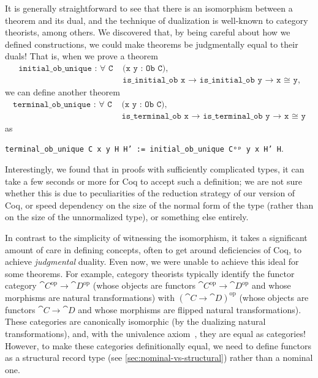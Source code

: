   It is generally straightforward to see that there is an isomorphism between a theorem and its dual, and the technique of dualization is well-known to category theorists, among others.  We discovered that, by being careful about how we defined constructions, we could make theorems be judgmentally equal to their duals!  That is, when we prove a theorem
  \begin{align*}
  \texttt{initial_ob_unique : ∀ C  } & \texttt{(x y : Ob C),} \\
  & \texttt{is_initial_ob x → is_initial_ob y → x ≅ y},
  \end{align*}
  we can define another theorem
  \begin{align*}
  \texttt{terminal_ob_unique : ∀ C  }& \texttt{(x y : Ob C),} \\
  & \texttt{is_terminal_ob x → is_terminal_ob y → x ≅ y}
  \end{align*}
  as
  \begin{center}
  \texttt{terminal_ob_unique C x y H H' := initial_ob_unique Cᵒᵖ y x H' H}.
  \end{center}
  Interestingly, we found that in proofs with sufficiently complicated types, it can take a few seconds or more for Coq to accept such a definition; we are not sure whether this is due to peculiarities of the reduction strategy of our version of Coq, or speed dependency on the size of the normal form of the type (rather than on the size of the unnormalized type), or something else entirely.

  In contrast to the simplicity of witnessing the isomorphism, it takes a significant amount of care in defining concepts, often to get around deficiencies of Coq, to achieve \emph{judgmental} duality.
  Even now, we were unable to achieve this ideal for some theorems.
  For example, category theorists typically identify the functor category $\cat{C}^\text{op} \to \cat{D}^\text{op}$ (whose objects are functors $\cat{C}^\text{op} \to \cat{D}^\text{op}$ and whose morphisms are natural transformations) with $(\cat{C} \to \cat{D})^\text{op}$ (whose objects are functors $\cat{C} \to \cat{D}$ and whose morphisms are flipped natural transformations).
  These categories are canonically isomorphic (by the dualizing natural transformations), and, with the univalence axiom~\cite{HoTTBook}, they are equal as categories!
  However, to make these categories definitionally equal, we need to define functors as a structural record type (see \autoref{sec:nominal-vs-structural}) rather than a nominal one.

